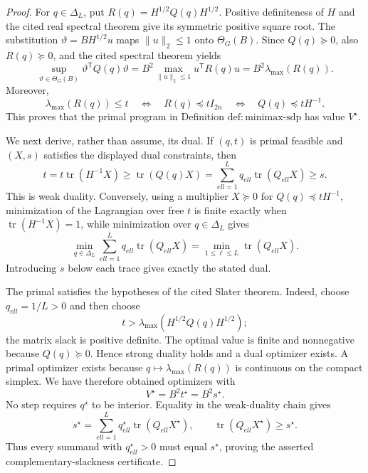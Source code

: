 \documentclass{article}
\begin{document}
\begin{proof}
For \(q\in\Delta_L\), put \(R(q)=H^{1/2}Q(q)H^{1/2}\).  Positive definiteness of \(H\) and the cited real spectral theorem give its symmetric positive square root.  The substitution \(\vartheta=BH^{1/2}u\) maps \(\|u\|_2\le1\) onto \(\Theta_G(B)\).  Since \(Q(q)\succeq0\), also \(R(q)\succeq0\), and the cited spectral theorem yields
\[
 \sup_{\vartheta\in\Theta_G(B)}\vartheta^{\mathsf T}Q(q)\vartheta
 =B^2\max_{\|u\|_2\le1}u^{\mathsf T}R(q)u
 =B^2\lambda_{\max}(R(q)).
\]
Moreover,
\[
 \lambda_{\max}(R(q))\le t
 \quad\Longleftrightarrow\quad
 R(q)\preceq tI_{2n}
 \quad\Longleftrightarrow\quad
 Q(q)\preceq tH^{-1}.
\]
This proves that the primal program in Definition \(\mathrm{def:minimax\mbox{-}sdp}\) has value \(V^{\star}\).

We next derive, rather than assume, its dual.  If \((q,t)\) is primal feasible and \((X,s)\) satisfies the displayed dual constraints, then
\[
 t
 =t\operatorname{tr}(H^{-1}X)
 \ge\operatorname{tr}(Q(q)X)
 =\sum_{ell=1}^Lq_{ell}\operatorname{tr}(Q_{ell}X)
 \ge s.
\]
This is weak duality.  Conversely, using a multiplier \(X\succeq0\) for \(Q(q)\preceq tH^{-1}\), minimization of the Lagrangian over free \(t\) is finite exactly when \(\operatorname{tr}(H^{-1}X)=1\), while minimization over \(q\in\Delta_L\) gives
\[
 \min_{q\in\Delta_L}\sum_{ell=1}^Lq_{ell}\operatorname{tr}(Q_{ell}X)
 =\min_{1\le\ell\le L}\operatorname{tr}(Q_{ell}X).
\]
Introducing \(s\) below each trace gives exactly the stated dual.

The primal satisfies the hypotheses of the cited Slater theorem.  Indeed, choose \(q_{ell}=1/L>0\) and then choose
\[
 t>\lambda_{\max}\!\left(H^{1/2}Q(q)H^{1/2}\right);
\]
the matrix slack is positive definite.  The optimal value is finite and nonnegative because \(Q(q)\succeq0\).  Hence strong duality holds and a dual optimizer exists.  A primal optimizer exists because \(q\mapsto\lambda_{\max}(R(q))\) is continuous on the compact simplex.  We have therefore obtained optimizers with
\[
 V^{\star}=B^2t^{\star}=B^2s^{\star}.
\]
No step requires \(q^{\star}\) to be interior.  Equality in the weak-duality chain gives
\[
 s^{\star}
 =\sum_{ell=1}^Lq_{ell}^{\star}\operatorname{tr}(Q_{ell}X^{\star}),
 \qquad
 \operatorname{tr}(Q_{ell}X^{\star})\ge s^{\star}.
\]
Thus every summand with \(q_{ell}^{\star}>0\) must equal \(s^{\star}\), proving the asserted complementary-slackness certificate.


\end{proof}
\end{document}
